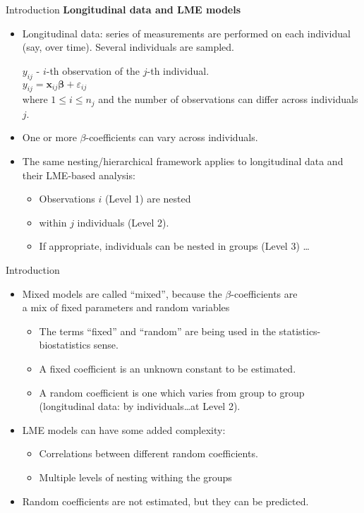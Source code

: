 \documentclass{beamer}
\begin{document}
\begin{frame}{Introduction}
\textbf{Longitudinal data and LME models}
\medskip
\begin{itemize}
\item Longitudinal data: series of measurements are performed on each individual (say, over time). Several individuals are sampled. \\ \medskip

$y_{ij}$ - $i$-th observation of the $j$-th individual. \\ \smallskip
\medskip
$y_{ij} =  \bm{x}_{ij}\bm{\beta} + \varepsilon_{ij}$\\
\medskip
where $ 1 \leq i \leq n_j$ and the number of observations can differ across individuals $j$.\\ \bigskip
\item One or more $\beta$-coefficients can vary across individuals.
\bigskip
\item The same nesting/hierarchical framework applies to longitudinal data and their LME-based analysis:
\medskip
\begin{itemize}
    \item Observations $i$ (Level 1) are nested
    \smallskip
    \item within $j$ individuals (Level 2).
    \smallskip
    \item If appropriate, individuals can be nested in groups (Level 3) \dots 
\end{itemize}
\end{itemize}
\end{frame}
\begin{frame}{Introduction}
\begin{itemize}
\item Mixed models are called ``mixed'', because the $\beta$-coefficients are \\a mix of fixed parameters and random variables
\smallskip 
\begin{itemize}
\item The terms ``fixed'' and ``random'' are being used in the statistics-biostatistics sense.
\item A fixed coefficient is an unknown constant to be estimated.
\item A random coefficient is one which varies from group to group \\(longitudinal data: by individuals\dots at Level 2).
\end{itemize}
\smallskip
\item  LME models can have some added complexity:
\smallskip
\begin{itemize}
\item Correlations between different random coefficients.
\smallskip
\item Multiple levels of nesting withing the groups
\end{itemize}
\smallskip
\item Random  coefficients are not estimated, but they can be predicted.
\end{itemize}
\end{frame}
\end{document}
